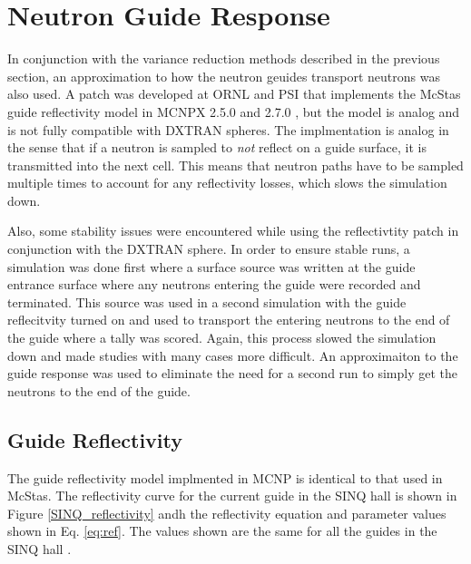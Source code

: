\documentclass[a4paper]{jpconf}
\begin{document}
\section{Neutron Guide Response} 

In conjunction with the variance reduction methods described in the previous section, an approximation to how the neutron geuides transport neutrons was also used.  A patch was developed at ORNL and PSI that implements the McStas guide reflectivity model in MCNPX 2.5.0 and 2.7.0 \cite{mcnp_reflectivity, EK_reflectivity}, but the model is analog and is not fully compatible with DXTRAN spheres.  The implmentation is analog in the sense that if a neutron is sampled to \emph{not} reflect on a guide surface, it is transmitted into the next cell.  This means that neutron paths have to be sampled multiple times to account for any reflectivity losses, which slows the simulation down.  

Also, some stability issues were encountered while using the reflectivtity patch in conjunction with the DXTRAN sphere.  In order to ensure stable runs, a simulation was done first where a surface source was written at the guide entrance surface where any neutrons entering the guide were recorded and terminated.  This source was used in a second simulation with the guide reflecitvity turned on and used to transport the entering neutrons to the end of the guide where a tally was scored.  Again, this process slowed the simulation down and made studies with many cases more difficult.  An approximaiton to the guide response was used to eliminate the need for a second run to simply get the neutrons to the end of the guide.


\subsection{Guide Reflectivity}

The guide reflectivity model implmented in MCNP is identical to that used in McStas.  The reflectivity curve for the current guide in the SINQ hall is shown in Figure \ref{SINQ_reflectivity} andh the reflectivity equation and parameter values shown in Eq. \ref{eq:ref}.  The values shown are the same for all the guides in the SINQ hall \cite{SINQ_guide_values}.
\end{document}
